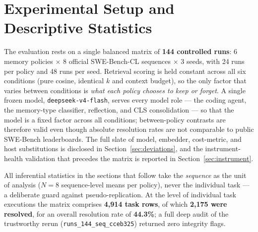 
\section{Experimental Setup and Descriptive Statistics}

The evaluation rests on a single balanced matrix of \textbf{144 controlled runs}:
6 memory policies $\times$ 8 official SWE-Bench-CL sequences $\times$ 3 seeds, with
24 runs per policy and 48 runs per seed. Retrieval scoring is held constant across all
six conditions (pure cosine, identical $k$ and context budget), so the only factor that
varies between conditions is \emph{what each policy chooses to keep or forget}. A single
frozen model, \texttt{deepseek-v4-flash}, serves every model role --- the coding agent,
the memory-type classifier, reflection, and CLS consolidation --- so that the model is a
fixed factor across all conditions; between-policy contrasts are therefore valid even
though absolute resolution rates are not comparable to public SWE-Bench leaderboards. The
full slate of model, embedder, cost-metric, and host substitutions is disclosed in
Section~\ref{sec:deviations}, and the instrument-health validation that precedes the
matrix is reported in Section~\ref{sec:instrument}.

All inferential statistics in the sections that follow take the \emph{sequence} as the
unit of analysis ($N=8$ sequence-level means per policy), never the individual task ---
a deliberate guard against pseudo-replication. At the level of individual task executions
the matrix comprises \textbf{4{,}914 task rows}, of which \textbf{2{,}175 were resolved},
for an overall resolution rate of \textbf{44.3\%}; a full deep audit of the trustworthy
rerun (\texttt{runs\_144\_seq\_cceb325}) returned zero integrity flags.

